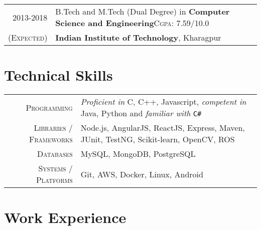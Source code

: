 \documentclass[a4paper,11pt]{extarticle} %
\begin{document}
\begin{tabular}{r|p{17.5cm}}	
2013-2018 & B.Tech and M.Tech (Dual Degree) in \textbf{Computer Science and Engineering}\hfill\textsc{Cgpa}: 7.59/10.0\\
\textsc{(Expected)}&\textbf{Indian Institute of Technology}, Kharagpur\\
\end{tabular}


\section{Technical Skills}

\begin{tabular}{r|p{15cm}}
\textsc{Programming} & \textit{Proficient in} C, C++, Javascript, \textit{competent in} Java, Python and \textit{familiar with} \verb!C#! \\
\textsc{Libraries / Frameworks} & Node.js, AngularJS, ReactJS, Express, Maven, JUnit, TestNG, Scikit-learn, OpenCV, ROS\\
\textsc{Databases} & MySQL, MongoDB, PostgreSQL\\
\textsc{Systems / Platforms} & Git, AWS, Docker, Linux, Android\\
\end{tabular}

\section{Work Experience}
\end{document}
